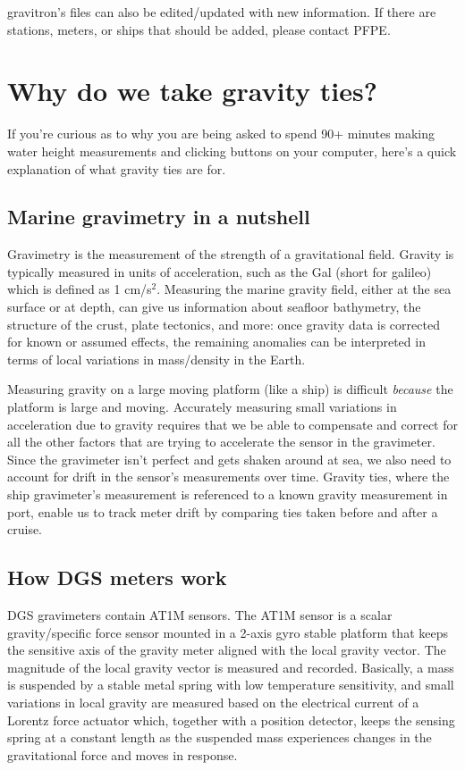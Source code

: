 \documentclass{pfpe-manual}
\begin{document}
gravitron's files can also be edited/updated with new information. If there are stations, meters, or ships that should be added, please contact PFPE.

\section{Why do we take gravity ties?}
If you're curious as to why you are being asked to spend 90+ minutes making water height measurements and clicking buttons on your computer, here's a quick explanation of what gravity ties are for.

\subsection{Marine gravimetry in a nutshell}
Gravimetry is the measurement of the strength of a gravitational field. Gravity is typically measured in units of acceleration, such as the Gal (short for galileo) which is defined as 1 cm/s$^2$. Measuring the marine gravity field, either at the sea surface or at depth, can give us information about seafloor bathymetry, the structure of the crust, plate tectonics, and more: once gravity data is corrected for known or assumed effects, the remaining anomalies can be interpreted in terms of local variations in mass/density in the Earth.

Measuring gravity on a large moving platform (like a ship) is difficult \emph{because} the platform is large and moving. Accurately measuring small variations in acceleration due to gravity requires that we be able to compensate and correct for all the other factors that are trying to accelerate the sensor in the gravimeter. Since the gravimeter isn't perfect and gets shaken around at sea, we also need to account for drift in the sensor's measurements over time. Gravity ties, where the ship gravimeter's measurement is referenced to a known gravity measurement in port, enable us to track meter drift by comparing ties taken before and after a cruise. 

\subsection{How DGS meters work}
DGS gravimeters contain AT1M sensors. The AT1M sensor is a scalar gravity/specific force sensor mounted in a 2-axis gyro stable platform that keeps the sensitive axis of the gravity meter aligned with the local gravity vector. The magnitude of the local gravity vector is measured and recorded. Basically, a mass is suspended by a stable metal spring with low temperature sensitivity, and small variations in local gravity are measured based on the electrical current of a Lorentz force actuator which, together with a position detector, keeps the sensing spring at a constant length as the suspended mass experiences changes in the gravitational force and moves in response.
\end{document}
